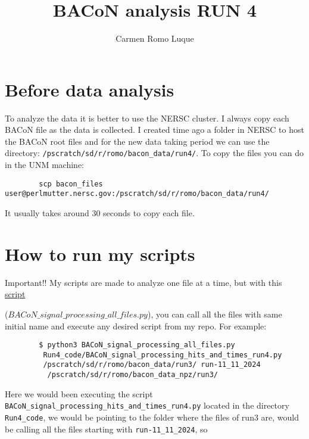 \documentclass[11pt,a4paper,english,oneside, pdf]{article}
\title{BACoN analysis RUN 4}
\author{Carmen Romo Luque}
\begin{document}
	\maketitle
	
	
	\tableofcontents
	
	
	\clearpage
	
	\section{Before data analysis}
	
	To analyze the data it is better to use the NERSC cluster. I always copy each BACoN file as the data is collected. I created time ago a folder in NERSC to host the BACoN root files and for the new data taking period we can use the directory: \verb|/pscratch/sd/r/romo/bacon_data/run4/|. To copy the files you can do in the UNM machine:
	
	\begin{verbatim}
		scp bacon_files user@perlmutter.nersc.gov:/pscratch/sd/r/romo/bacon_data/run4/
	\end{verbatim}
	
	It usually takes around 30 seconds to copy each file.
	
	
	\section{How to run my scripts}
	
	Important!! My scripts are made to analyze one file at a time, but with this \href{https://github.com/carmenromo/BACON/blob/main/BACoN_signal_processing_all_files.py}{script}
	
	 ($BACoN\_signal\_processing\_all\_files.py$), you can call all the files with same initial name and execute any desired script from my repo. For example:
	
	\begin{verbatim}
		$ python3 BACoN_signal_processing_all_files.py
		 Run4_code/BACoN_signal_processing_hits_and_times_run4.py
		 /pscratch/sd/r/romo/bacon_data/run3/ run-11_11_2024 
		  /pscratch/sd/r/romo/bacon_data_npz/run3/
	\end{verbatim}
	
	Here we would been executing the script \verb|BACoN_signal_processing_hits_and_times_run4.py| located in the directory \verb|Run4_code|, we would be pointing to the folder where the files of run3 are, would be calling all the files starting with \verb|run-11_11_2024|, so
	
\end{document}
